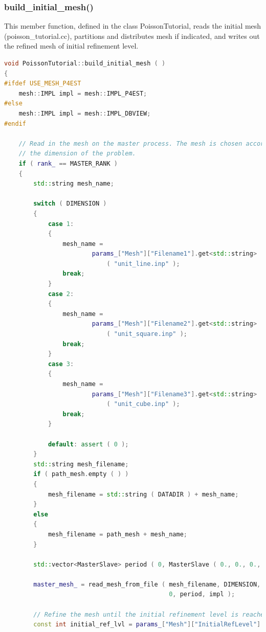 \documentclass[a4paper, 11pt, twoside]{article}
\begin{document}
\subsubsection{build\_initial\_mesh()}\label{read-mesh}
This member function, defined in the class PoissonTutorial, reads the initial mesh (poisson\_tutorial.cc), partitions and distributes mesh if indicated, and writes out the refined mesh of initial refinement level.

\begin{lstlisting}[language=C++, basicstyle={\footnotesize, \ttfamily}, keywordstyle=\color{blue}, numbers=none, tabsize=4]
void PoissonTutorial::build_initial_mesh ( )
{
#ifdef USE_MESH_P4EST
    mesh::IMPL impl = mesh::IMPL_P4EST;
#else
    mesh::IMPL impl = mesh::IMPL_DBVIEW;
#endif

    // Read in the mesh on the master process. The mesh is chosen according to 
    // the dimension of the problem.
    if ( rank_ == MASTER_RANK )
    {
        std::string mesh_name;

        switch ( DIMENSION )
        {
            case 1:
            {
                mesh_name =
                        params_["Mesh"]["Filename1"].get<std::string>
                            ( "unit_line.inp" );
                break;
            }
            case 2:
            {
                mesh_name =
                        params_["Mesh"]["Filename2"].get<std::string>
                            ( "unit_square.inp" );
                break;
            }
            case 3:
            {
                mesh_name =
                        params_["Mesh"]["Filename3"].get<std::string>
                            ( "unit_cube.inp" );
                break;
            }

            default: assert ( 0 );
        }
        std::string mesh_filename;
        if ( path_mesh.empty ( ) )
        {
            mesh_filename = std::string ( DATADIR ) + mesh_name;
        }
        else
        {
            mesh_filename = path_mesh + mesh_name;
        }

        std::vector<MasterSlave> period ( 0, MasterSlave ( 0., 0., 0., 0 ) );

        master_mesh_ = read_mesh_from_file ( mesh_filename, DIMENSION, DIMENSION, 
                                             0, period, impl );

        // Refine the mesh until the initial refinement level is reached.
        const int initial_ref_lvl = params_["Mesh"]["InitialRefLevel"].get<int>( 3 );


\end{lstlisting}
\end{document}
